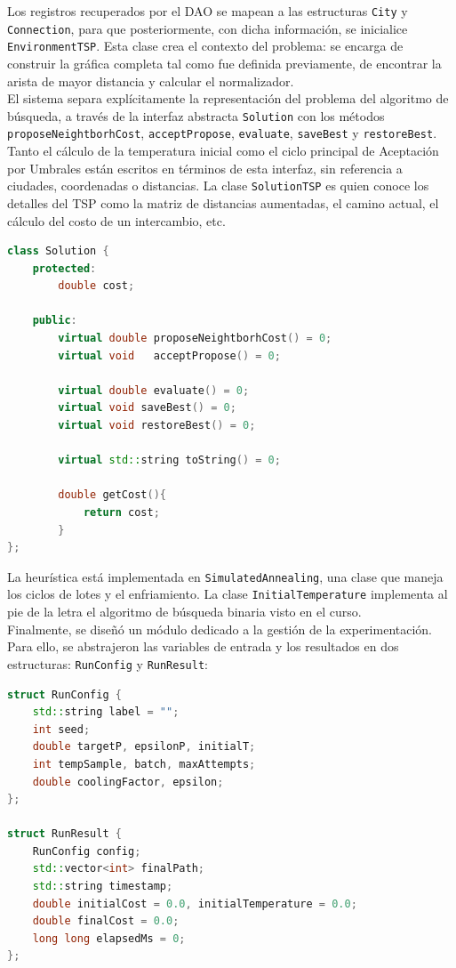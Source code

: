 \documentclass[9pt,a4paper,twocolumn,twoside]{rho-class/rho}
\begin{document}
Los registros recuperados por el DAO se mapean a las estructuras \texttt{City} y \texttt{Connection}, 
para que posteriormente, con dicha información, se inicialice \texttt{EnvironmentTSP}. Esta
clase crea el contexto del problema: se encarga de construir la gráfica completa tal como fue
definida previamente, de encontrar la arista de mayor distancia y calcular el normalizador.\\

El sistema separa explícitamente la representación del problema del algoritmo de búsqueda,
a través de la interfaz abstracta \texttt{Solution} con los métodos
\texttt{proposeNeightborhCost}, \texttt{acceptPropose}, \texttt{evaluate}, \texttt{saveBest} y
\texttt{restoreBest}. Tanto el cálculo de la temperatura inicial como el ciclo principal de
Aceptación por Umbrales están escritos en términos de esta interfaz, sin referencia a ciudades,
coordenadas o distancias. La clase \texttt{SolutionTSP} es quien conoce los detalles del TSP
como la matriz de distancias aumentadas, el camino actual, el cálculo del costo de un
intercambio, etc.

\begin{lstlisting}[language=C++, caption={Definición de la interfaz Solution.}]
class Solution {
    protected:
        double cost;

    public:
        virtual double proposeNeightborhCost() = 0;
        virtual void   acceptPropose() = 0;

        virtual double evaluate() = 0;
        virtual void saveBest() = 0;
        virtual void restoreBest() = 0;

        virtual std::string toString() = 0;
  
        double getCost(){
            return cost;
        }
};
\end{lstlisting}
La heurística está implementada en \texttt{SimulatedAnnealing}, una clase que maneja los ciclos 
de lotes y el enfriamiento. La clase \texttt{InitialTemperature} implementa al pie de la letra
el algoritmo de búsqueda binaria visto en el curso. \\

Finalmente, se diseñó un módulo dedicado a la gestión de la experimentación. Para ello, se
abstrajeron las variables de entrada y los resultados en dos estructuras: \texttt{RunConfig} y 
\texttt{RunResult}:

\begin{lstlisting}[language=C++, caption={Estructuras para la gestión de experimentos.}]
struct RunConfig {
    std::string label = "";
    int seed;
    double targetP, epsilonP, initialT;
    int tempSample, batch, maxAttempts;
    double coolingFactor, epsilon;
};

struct RunResult {
    RunConfig config;
    std::vector<int> finalPath;   
    std::string timestamp;   
    double initialCost = 0.0, initialTemperature = 0.0;
    double finalCost = 0.0;
    long long elapsedMs = 0;
};
\end{lstlisting}
\end{document}
